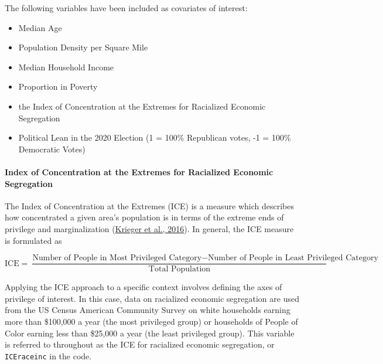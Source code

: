 \documentclass[
]{article}
\providecommand{\tightlist}{%
  \setlength{\itemsep}{0pt}\setlength{\parskip}{0pt}}
\begin{document}
The following variables have been included as covariates of interest:

\begin{itemize}
\tightlist
\item
  Median Age
\item
  Population Density per Square Mile
\item
  Median Household Income
\item
  Proportion in Poverty
\item
  the Index of Concentration at the Extremes for Racialized Economic Segregation
\item
  Political Lean in the 2020 Election (1 = 100\% Republican votes, -1 = 100\% Democratic Votes)
\end{itemize}

\hypertarget{index-of-concentration-at-the-extremes-for-racialized-economic-segregation}{%
\paragraph{Index of Concentration at the Extremes for Racialized Economic Segregation}\label{index-of-concentration-at-the-extremes-for-racialized-economic-segregation}}

The Index of Concentration at the Extremes (ICE) is a measure which describes
how concentrated a given area's population is in terms of the extreme ends of
privilege and marginalization (\protect\hyperlink{ref-krieger_public_2016}{Krieger et al., 2016}).
In general, the ICE measure is formulated as

\[ \text{ICE} = \frac{\text{Number of People in Most Privileged Category} - \text{Number of People in Least Privileged Category}}{\text{Total Population}}\]

Applying the ICE approach to a specific context involves defining the axes of
privilege of interest. In this case, data on racialized economic segregation
are used from the US Census American Community Survey on white households
earning more than \$100,000 a year (the most privileged group) or households of
People of Color earning less than \$25,000 a year (the least privileged group).
This variable is referred to throughout as the ICE for racialized economic
segregation, or \texttt{ICEraceinc} in the code.
\end{document}
